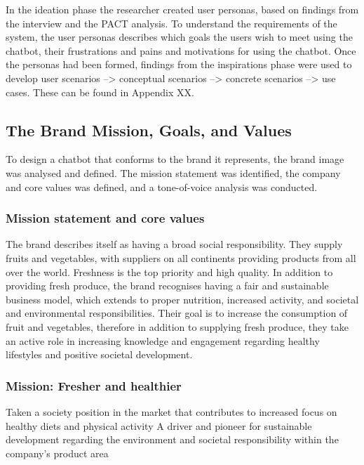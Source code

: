     In the ideation phase the researcher created user personas, based on findings from the interview and the PACT analysis. To understand the requirements of the system, the user personas describes which goals the users wish to meet using the chatbot, their frustrations and pains and motivations for using the chatbot. Once the personas had been formed, findings from the inspirations phase were used to develop user scenarios --> conceptual scenarios --> concrete scenarios --> use cases. These can be found in Appendix XX.
    
    
\vspace{2,5mm} %

    \subsection{The Brand Mission, Goals, and Values}
    To design a chatbot that conforms to the brand it represents, the brand image was analysed and defined. The mission statement was identified, the company and core values was defined, and a tone-of-voice analysis was conducted.
    
\vspace{2,5mm}
    
        \subsubsection{Mission statement and core values}
 
        The brand describes itself as having a broad social responsibility. They supply fruits and vegetables, with suppliers on all continents providing products from all over the world. Freshness is the top priority and high quality. In addition to providing fresh produce, the brand recognises having a fair and sustainable business model, which extends to proper nutrition, increased activity, and societal and environmental responsibilities. Their goal is to increase the consumption of fruit and vegetables, therefore in addition to supplying fresh produce, they take an active role in increasing knowledge and engagement regarding healthy lifestyles and positive societal development.
 
\vspace{2,5mm}
  
        \subsubsection{Mission: Fresher and healthier}
        Taken a society position in the  market that contributes to increased focus on healthy diets and physical activity
        A driver and pioneer for sustainable development regarding the environment and societal responsibility within the company’s product area
        
